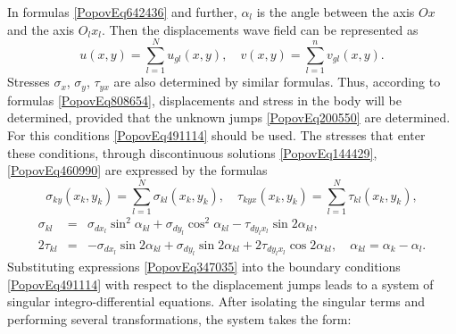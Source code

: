 In formulas \eqref{PopovEq642436} and further, $\alpha _{l} $ is the angle between the axis $Ox$ and the axis $O_{l} x_{l} $. Then the displacements wave field can be represented as
\begin{equation} \label{PopovEq808654} 
	u(x,y)=\sum _{l=1}^{N}u_{gl} (x,y),\quad v(x,y)=\sum _{l=1}^{n}v_{gl} (x,y) . 
\end{equation} 
Stresses $\sigma _{x}$, $\sigma _{y}$, $\tau _{yx}$ are also determined by similar formulas. Thus, according to formulas \eqref{PopovEq808654}, displacements and stress in the body will be determined, provided that the unknown jumps \eqref{PopovEq200550} are determined. For this conditions \eqref{PopovEq491114} should be used. The stresses that enter these conditions, through discontinuous solutions \eqref{PopovEq144429}, \eqref{PopovEq460990} are expressed by the formulas
\begin{equation} \label{PopovEq347035} 
	\sigma _{ky} (x_{k} ,y_{k} )=\sum _{l=1}^{N}\sigma _{kl} (x_{k} ,y_{k} ),\quad \tau _{kyx} (x_{k} ,y_{k} )=\sum _{l=1}^{N}\tau _{kl} (x_{k} ,y_{k} ) ,     
\end{equation} 
\[
\begin{array}{rcl} \sigma _{kl}&=&\sigma _{dx_{l} } \sin ^{2} \alpha _{kl} +\sigma _{dy_{l} } \cos ^{2} \alpha _{kl} -\tau _{dy_{l} x_{l} } \sin 2\alpha _{kl}, 
	\\
	2\tau _{kl} &=&-\sigma _{dx_{l} } \sin 2\alpha _{kl} +\sigma _{dy_{l} } \sin 2\alpha _{kl} +2\tau _{dy_{l} x_{l} } \cos 2\alpha _{kl},\quad\alpha _{kl} =\alpha _{k} -\alpha _{l}. 
\end{array}
\] 
Substituting expressions \eqref{PopovEq347035} into the boundary conditions \eqref{PopovEq491114} with respect to the displacement jumps leads to a system of singular integro-differential equations. After isolating the singular terms and performing several transformations, the system takes the form:

